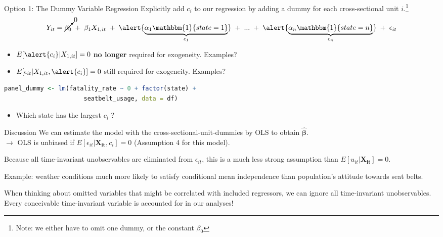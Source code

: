 \documentclass[9pt,aspectratio=169]{beamer}
\begin{document}
\begin{frame}[fragile]{Option 1: The Dummy Variable Regression}
Explicitly add $c_i$ to our regression by adding a \alert{dummy} for each cross-sectional unit $i$.\footnote{Note: we either have to omit one dummy, or the constant $\beta_0$} 
\vspace{-0.2cm}
\begin{align*}
       Y_{it} = \cancelto{0}{\beta_0} \; + \;\beta_1 X_{1,it} \; + \; \alert{\underbrace{\alpha_1 \mathbbm{1}\{state = 1\}}_{c_1}} \; + \; ... \; + \; \alert{\underbrace{\alpha_n \mathbbm{1}\{state = n\}}_{c_n}}
       \; + \; \epsilon_{it} %
\end{align*}
\pause
\vspace{-0.9cm}
\begin{itemize}
    \item $E[\alert{c_i}|X_{1,it}] = 0$ \textbf{no longer} required for exogeneity. Examples? \pause
    \item $E[\epsilon_{it}|X_{1,it}, \alert{c_i}] = 0$ still required for exogeneity.   Examples?
\end{itemize}
\pause
\vspace{0.2cm}
\begin{lstlisting}[language=R]
    panel_dummy <- lm(fatality_rate ~ 0 + factor(state) + 
                      seatbelt_usage, data = df)
\end{lstlisting}
\pause
\vspace{-0.2cm}
\begin{itemize}
    \item[$\rightarrow$] Which state has the largest $c_i$ ? 
\end{itemize}
\end{frame}

\begin{frame}{Discussion}
We can estimate the model with the cross-sectional-unit-dummies by  OLS to obtain $\hat{\boldsymbol{\beta}}$. \\
$\rightarrow$ OLS is unbiased if $E[\epsilon_{it}|\boldsymbol{X_{it}}, c_i] = 0$ (Assumption 4 for this model).

Because all time-invariant unobservables are eliminated from $\epsilon_{it}$, this is a much less strong assumption than $E[u_{it}|\boldsymbol{X_{it}}] = 0$.

Example: weather conditions much more likely to satisfy conditional mean independence than population's attitude towards seat belts.

When thinking about omitted variables that might be correlated with included regressors, we can ignore all time-invariant unobservables.  Every conceivable time-invariant variable is accounted for in our analyses!
\end{frame}
\end{document}
